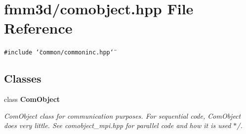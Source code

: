 \section{fmm3d/comobject.hpp File Reference}
\label{comobject_8hpp}


{\tt \#include \char`\"{}common/commoninc.hpp\char`\"{}}\par
\subsection*{Classes}
\begin{CompactItemize}
\item 
class {\bf Com\-Object}
\begin{CompactList}\small\item\em Com\-Object class for communication purposes. For sequential code, Com\-Object does very little. See comobject\_\-mpi.hpp for parallel code and how it is used $\ast$/. \item\end{CompactList}\end{CompactItemize}
